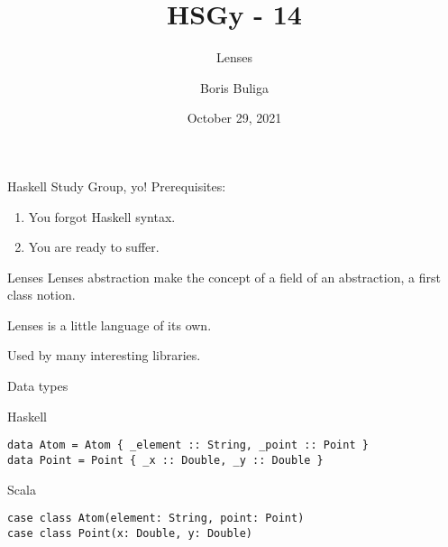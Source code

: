 \documentclass[presentation,aspectratio=169,8pt]{beamer}
\author{Boris Buliga}
\date{October 29, 2021}
\title{HSGy - 14}
\subtitle{Lenses}
\begin{document}
\maketitle
\newcommand{\mathcolorbox}[2]{%
  \begingroup
  \setlength{\fboxsep}{2pt}%
  \colorbox{#1}{$\displaystyle #2$}%
  \endgroup
}


\begin{frame}[label={sec:orgf1d0005}]{Haskell Study Group, yo!}
Prerequisites:

\begin{enumerate}
\item You forgot Haskell syntax.
\item You are ready to suffer.
\end{enumerate}
\end{frame}

\begin{frame}[label={sec:org3d5ead0}]{Lenses}
Lenses abstraction make the concept of a field of an abstraction, a first class
notion.

Lenses is a little language of its own.

Used by many interesting libraries.
\end{frame}

\begin{frame}[label={sec:org1443c8e},fragile]{Data types}
 \begin{block}{Haskell}
\begin{verbatim}
data Atom = Atom { _element :: String, _point :: Point }
data Point = Point { _x :: Double, _y :: Double }
\end{verbatim}
\end{block}

\begin{block}{Scala}
\begin{verbatim}
case class Atom(element: String, point: Point)
case class Point(x: Double, y: Double)
\end{verbatim}
\end{block}
\end{frame}
\end{document}
